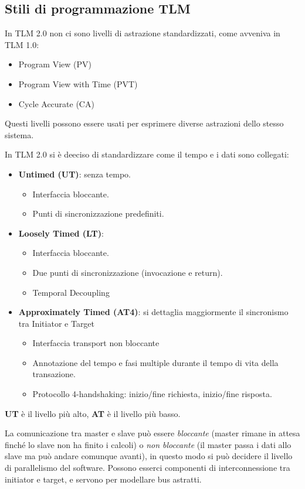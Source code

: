 \documentclass[a4paper]{article}
\begin{document}
		\subsection{Stili di programmazione TLM}
			In TLM 2.0 non ci sono livelli di astrazione standardizzati, come avveniva in TLM 1.0:
			\begin{itemize}
				\item Program View (PV)
				\item Program View with Time (PVT)
				\item Cycle Accurate (CA)
			\end{itemize}
			Questi livelli possono essere usati per esprimere diverse astrazioni dello stesso sistema.
			
			\noindent
			In TLM 2.0 si è deeciso di standardizzare come il tempo e i dati sono collegati:
			\begin{itemize}
				\item \textbf{Untimed (UT)}: senza tempo. 
					\begin{itemize}
						\item Interfaccia bloccante. 
						\item Punti di sincronizzazione predefiniti.
					\end{itemize}
				\item \textbf{Loosely Timed (LT)}:
					\begin{itemize}
						\item Interfaccia bloccante.
						\item Due punti di sincronizzazione (invocazione e return).
						\item Temporal Decoupling
					\end{itemize}
				\item \textbf{Approximately Timed (AT4)}: si dettaglia maggiormente il sincronismo tra Initiator e Target
					\begin{itemize}
						\item Interfaccia transport non bloccante
						\item Annotazione del tempo e fasi multiple durante il tempo di vita della transazione.
						\item Protocollo 4-handshaking: inizio/fine richiesta, inizio/fine risposta.
					\end{itemize}
			\end{itemize}
			
			\textbf{UT} è il livello più alto, \textbf{AT} è il livello più basso. 
			
			La comunicazione tra master e slave può essere \textit{bloccante} (master rimane in attesa finché lo slave non ha finito i calcoli) o \textit{non bloccante} (il master passa i dati allo slave ma può andare comunque avanti), in questo modo si può decidere il livello di parallelismo del software. Possono esserci componenti di interconnessione tra initiator e target, e servono per modellare bus astratti.
			
\end{document}
